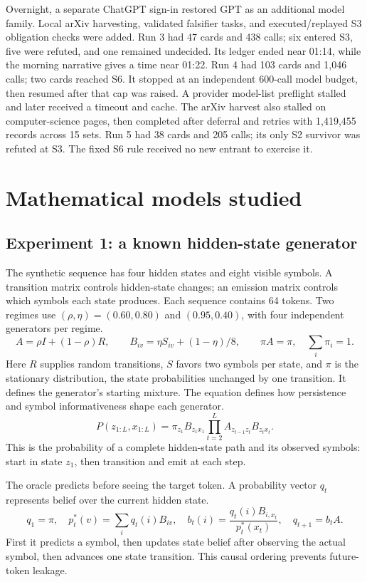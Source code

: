 Overnight, a separate ChatGPT sign-in restored GPT as an additional model family. Local arXiv harvesting, validated falsifier tasks, and executed/replayed S3 obligation checks were added. Run 3 had 47 cards and 438 calls; six entered S3, five were refuted, and one remained undecided. Its ledger ended near 01:14, while the morning narrative gives a time near 01:22. Run 4 had 103 cards and 1,046 calls; two cards reached S6. It stopped at an independent 600-call model budget, then resumed after that cap was raised. A provider model-list preflight stalled and later received a timeout and cache. The arXiv harvest also stalled on computer-science pages, then completed after deferral and retries with 1,419,455 records across 15 sets. Run 5 had 38 cards and 205 calls; its only S2 survivor was refuted at S3. The fixed S6 rule received no new entrant to exercise it.

\section{Mathematical models studied}
\subsection{Experiment 1: a known hidden-state generator}

The synthetic sequence has four hidden states and eight visible symbols. A transition matrix controls hidden-state changes; an emission matrix controls which symbols each state produces. Each sequence contains 64 tokens. Two regimes use $(\rho,\eta)=(0.60,0.80)$ and $(0.95,0.40)$, with four independent generators per regime.
\begin{equation}
A=\rho I+(1-\rho)R,\qquad B_{iv}=\eta S_{iv}+(1-\eta)/8,\qquad \pi A=\pi,\quad \sum_i\pi_i=1.
\end{equation}
Here $R$ supplies random transitions, $S$ favors two symbols per state, and $\pi$ is the stationary distribution, the state probabilities unchanged by one transition. It defines the generator's starting mixture. The equation defines how persistence and symbol informativeness shape each generator.
\begin{equation}
P(z_{1:L},x_{1:L})=\pi_{z_1}B_{z_1x_1}\prod_{t=2}^{L}A_{z_{t-1}z_t}B_{z_tx_t}.
\end{equation}
This is the probability of a complete hidden-state path and its observed symbols: start in state $z_1$, then transition and emit at each step.

The oracle predicts before seeing the target token. A probability vector $q_t$ represents belief over the current hidden state.
\begin{equation}
q_1=\pi,\quad p_t^*(v)=\sum_iq_t(i)B_{iv},\quad b_t(i)=\frac{q_t(i)B_{i,x_t}}{p_t^*(x_t)},\quad q_{t+1}=b_tA.
\end{equation}
First it predicts a symbol, then updates state belief after observing the actual symbol, then advances one state transition. This causal ordering prevents future-token leakage.

